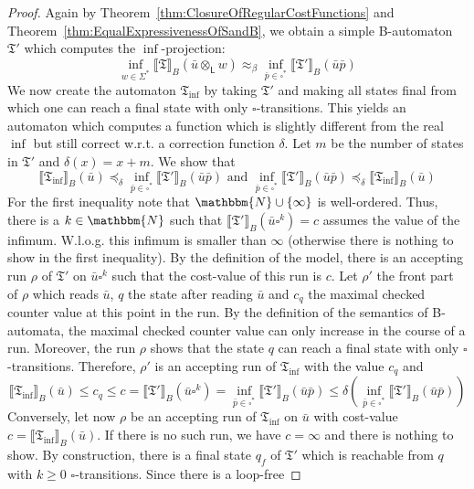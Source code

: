\documentclass{LMCS}
\newcommand{\nat}{\mathbbm{N}}
\newcommand{\pad}{\square}
\newcommand{\natInf}{\nat \cup \{ \infty \}}
\newcommand{\automatonT}{\mathfrak T}
\newcommand{\semantics}[1]{\llbracket#1\rrbracket}
\newcommand{\costlea}[1][\alpha]{\preceq_{#1}}
\newcommand{\costEquiv}[1][\alpha]{\approx_{#1}}
\newcommand{\padprodL}{\otimes_{\mathsf{L}}}
\begin{document}
\begin{proof}
Again by Theorem~\ref{thm:ClosureOfRegularCostFunctions} and
Theorem~\ref{thm:EqualExpressivenessOfSandB}, we obtain a simple B-automaton
$\automatonT'$ which computes the $\inf$-projection:
\[ 
 \inf_{w \in \Sigma^*} \semantics{\automatonT}_B(\bar u \padprodL w)
  \costEquiv[\beta] \inf_{\bar p \in \pad^*} \semantics{\automatonT'}_B 
 (\bar u \bar p) 
\]
We now create the automaton $\automatonT_{\inf}$ by taking $\automatonT'$ and
making all states final from which one can reach a final state with only
$\pad$-transitions. This yields an automaton which computes a function which is
slightly different from the real $\inf$ but still correct w.r.t. a
correction function $\delta$. Let $m$ be the number of states in
$\automatonT'$ and $\delta(x) = x + m$. We show that
\[
     \semantics{\automatonT_{\inf}}_B(\bar u) \costlea[\delta] 
     \inf_{\bar p \in \pad^*} \semantics{\automatonT'}_B(\bar u \bar p) 
     \text{ and }
     \inf_{\bar p \in \pad^*} \semantics{\automatonT'}_B(\bar u \bar p)
     \costlea[\delta]
     \semantics{\automatonT_{\inf}}_B(\bar u) 
\]
For the first inequality note that $\natInf$ is well-ordered. Thus, there
is a $k \in \nat$ such that $\semantics{\automatonT'}_B(\bar u \pad^k) = c$
assumes the value of the infimum. W.l.o.g. this infimum is smaller than $\infty$
(otherwise there is nothing to show in the first inequality). By the definition
of the model, there is an accepting run $\rho$ of $\automatonT'$ on $\bar
u\pad^k$ such that the cost-value of this run is $c$. Let $\rho'$ the front part
of $\rho$ which reads $\bar u$, $q$ the state after reading $\bar u$ and $c_q$
the maximal checked counter value at this point in the run. By the definition of
the semantics of B-automata, the maximal checked counter value can only increase
in the course of a run. Moreover, the run $\rho$ shows that the state $q$ can
reach a final state with only $\pad$-transitions. Therefore, $\rho'$ is an
accepting run of $\automatonT_{\inf}$ with the value $c_q$ and
\[
   \semantics{\automatonT_{\inf}}_B(\bar u) \le c_q \le c =
   \semantics{\automatonT'}_B(\bar u \pad^k) = 
   \inf\limits_{\bar p \in \pad^*} \semantics{\automatonT'}_B(\bar u \bar p) \le
   \delta\left(\inf\limits_{\bar p \in \pad^*} \semantics{\automatonT'}_B
   (\bar u \bar p)\right)
\]
Conversely, let now $\rho$ be an accepting run of $\automatonT_{\inf}$ on $\bar
u$ with cost-value $c = \semantics{\automatonT_{\inf}}_B(\bar u)$. If there is
no such run, we have $c = \infty$ and there is nothing to show. By construction,
there is a final state $q_f$ of $\automatonT'$ which is
reachable from $q$ with $k \ge 0$ $\pad$-transitions. Since there is a loop-free

\end{proof}
\end{document}
